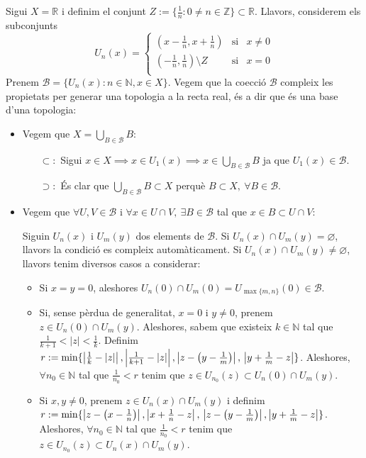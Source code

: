 \documentclass[10pt,a4paper]{article}
\theoremstyle{definition}
\newcommand{\NN}{\ensuremath{\mathbb{N}}}
\begin{document}
Sigui $X=\mathbb R$ i definim el conjunt $Z:=\{\frac{1}{n} : 0\neq n \in \mathbb Z\}\subset \mathbb R$. Llavors, considerem els subconjunts
$$U_n(x)=
      \left\{
      \begin{array}{ccc}
            (x-\frac{1}{n}, x+\frac{1}{n})        & \text{si} & x\ne 0 \\
            (-\frac{1}{n},\frac{1}{n})\setminus Z & \text{si} & x=0    \\
      \end{array}
      \right.$$
Prenem $\mathcal B=\{U_n(x):n\in \mathbb N, x\in X\}$. Vegem que la co\lgem ecció $\mathcal B$ compleix les propietats per generar una topologia a la recta real, és a dir que és una base d'una topologia:
\begin{itemize}
      \item Vegem que $X=\bigcup_{B\in \mathcal B}B$:
            \begin{itemize}
                  \item[$\subset:$] Sigui $x\in X \implies x\in U_1(x) \implies x\in \bigcup_{B\in \mathcal B}B$ ja que $U_1(x) \in \mathcal B$.
                  \item[$\supset:$] És clar que $\bigcup_{B\in \mathcal B}B \subset X$ perquè $B\subset X, \ \forall B\in \mathcal B$.
            \end{itemize}
      \item Vegem que $\forall U, V\in \mathcal B$ i $\forall x\in U\cap V,\ \exists B\in\mathcal B$ tal que $x\in B\subset U\cap V$:

            Siguin $U_n(x)$ i $U_m(y)$ dos elements de $\mathcal B$. Si $U_n(x)\cap U_m(y) =\varnothing$, llavors la condició es compleix automàticament. Si $U_n(x)\cap U_m(y) \neq \varnothing$, llavors tenim diversos casos a considerar:
            \begin{itemize}
                  \item Si $x=y=0$, aleshores $U_n(0)\cap U_m(0)=U_{\max\{m,n\}}(0)\in\mathcal{B}$.
                  \item Si, sense pèrdua de generalitat, $x=0$ i $y\ne 0$, prenem $z\in U_n(0)\cap U_m(y)$. Aleshores, sabem que existeix $k\in\NN$ tal que $\frac{1}{k+1}<|z|<\frac{1}{k}$. Definim $r:=\min\{\left|\frac{1}{k}-|z|\right|, \left|\frac{1}{k+1}-|z|\right|, \left|z-\left(y-\frac{1}{m}\right)\right|,\\ \left|y+\frac{1}{m}-z\right|\}$. Aleshores, $\forall n_0\in \mathbb N$ tal que $\frac{1}{n_0}<r$ tenim que $z\in U_{n_0}(z)\subset U_n(0)\cap U_m(y)$.
                  \item Si $x,y\ne 0$, prenem $z\in U_n(x)\cap U_m(y)$ i definim $r:=\min\{\left|z-\left(x-\frac{1}{n}\right)\right|,\left|x+\frac{1}{n}-z\right|,\\\left|z-\left(y-\frac{1}{m}\right)\right|, \left|y+\frac{1}{m}-z\right|\}$. Aleshores, $\forall n_0\in \mathbb N$ tal que $\frac{1}{n_0}<r$ tenim que $z\in U_{n_0}(z)\subset U_n(x)\cap U_m(y)$.
            \end{itemize}
\end{itemize}
\end{document}
